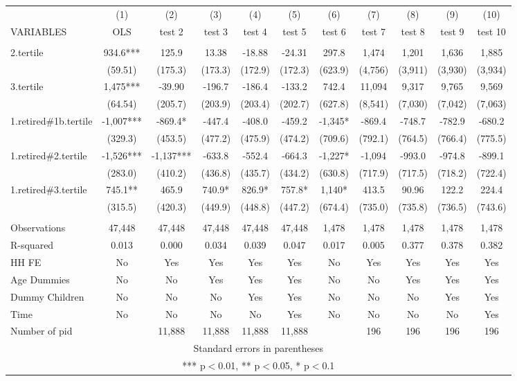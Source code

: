 \begin{tabular}{lcccccccccc} \hline
 & (1) & (2) & (3) & (4) & (5) & (6) & (7) & (8) & (9) & (10) \\
VARIABLES & OLS & test 2 & test 3 & test 4 & test 5 & test 6 & test 7 & test 8 & test 9 & test 10 \\ \hline
 &  &  &  &  &  &  &  &  &  &  \\
2.tertile & 934.6*** & 125.9 & 13.38 & -18.88 & -24.31 & 297.8 & 1,474 & 1,201 & 1,636 & 1,885 \\
 & (59.51) & (175.3) & (173.3) & (172.9) & (172.3) & (623.9) & (4,756) & (3,911) & (3,930) & (3,934) \\
3.tertile & 1,475*** & -39.90 & -196.7 & -186.4 & -133.2 & 742.4 & 11,094 & 9,317 & 9,765 & 9,569 \\
 & (64.54) & (205.7) & (203.9) & (203.4) & (202.7) & (627.8) & (8,541) & (7,030) & (7,042) & (7,063) \\
1.retired\#1b.tertile & -1,007*** & -869.4* & -447.4 & -408.0 & -459.2 & -1,345* & -869.4 & -748.7 & -782.9 & -680.2 \\
 & (329.3) & (453.5) & (477.2) & (475.9) & (474.2) & (709.6) & (792.1) & (764.5) & (766.4) & (775.5) \\
1.retired\#2.tertile & -1,526*** & -1,137*** & -633.8 & -552.4 & -664.3 & -1,227* & -1,094 & -993.0 & -974.8 & -899.1 \\
 & (283.0) & (410.2) & (436.8) & (435.7) & (434.2) & (630.8) & (717.9) & (717.5) & (718.2) & (722.4) \\
1.retired\#3.tertile & 745.1** & 465.9 & 740.9* & 826.9* & 757.8* & 1,140* & 413.5 & 90.96 & 122.2 & 224.4 \\
 & (315.5) & (420.3) & (449.9) & (448.8) & (447.2) & (674.4) & (735.0) & (735.8) & (736.5) & (743.6) \\
 &  &  &  &  &  &  &  &  &  &  \\
Observations & 47,448 & 47,448 & 47,448 & 47,448 & 47,448 & 1,478 & 1,478 & 1,478 & 1,478 & 1,478 \\
R-squared & 0.013 & 0.000 & 0.034 & 0.039 & 0.047 & 0.017 & 0.005 & 0.377 & 0.378 & 0.382 \\
HH FE & No & Yes & Yes & Yes & Yes & No & Yes & Yes & Yes & Yes \\
Age Dummies & No & No & Yes & Yes & Yes & No & No & Yes & Yes & Yes \\
Dummy Children & No & No & No & Yes & Yes & No & No & No & Yes & Yes \\
Time & No & No & No & No & Yes & No & No & No & No & Yes \\
 Number of pid &  & 11,888 & 11,888 & 11,888 & 11,888 &  & 196 & 196 & 196 & 196 \\ \hline
\multicolumn{11}{c}{ Standard errors in parentheses} \\
\multicolumn{11}{c}{ *** p$<$0.01, ** p$<$0.05, * p$<$0.1} \\
\end{tabular}
